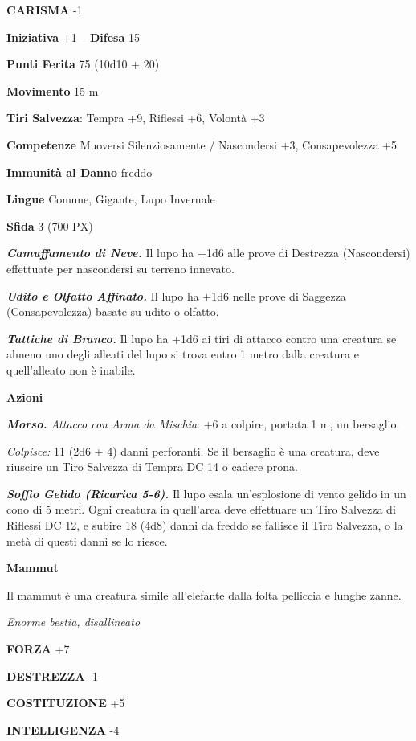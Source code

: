 \begin{multicols}{2}
\textbf{CARISMA} -1

\textbf{Iniziativa} +1 -- \textbf{Difesa} 15

\textbf{Punti Ferita} 75 (10d10 + 20)

\textbf{Movimento} 15 m

\textbf{Tiri Salvezza}: Tempra +9, Riflessi +6, Volontà +3

\textbf{Competenze} Muoversi Silenziosamente / Nascondersi +3, Consapevolezza +5

\textbf{Immunità al Danno} freddo

\textbf{Lingue} Comune, Gigante, Lupo Invernale

\textbf{Sfida} 3 (700 PX)

\textit{\textbf{Camuffamento di Neve.}} Il lupo ha +1d6 alle prove di Destrezza (Nascondersi) effettuate per nascondersi su terreno innevato.

\textit{\textbf{Udito e Olfatto Affinato.}} Il lupo ha +1d6 nelle prove di Saggezza (Consapevolezza) basate su udito o olfatto.

\textit{\textbf{Tattiche di Branco.}} Il lupo ha +1d6 ai tiri di attacco contro una creatura se almeno uno degli alleati del lupo si trova entro 1 metro dalla creatura e quell'alleato non è inabile.

\textbf{Azioni}

\textit{\textbf{Morso.} Attacco con Arma da Mischia}: +6 a colpire, portata 1 m, un bersaglio.

\textit{Colpisce:} 11 (2d6 + 4) danni perforanti. Se il bersaglio è una creatura, deve riuscire un Tiro Salvezza di Tempra DC 14 o cadere prona.

\textit{\textbf{Soffio Gelido (Ricarica 5-6).}} Il lupo esala un'esplosione di vento gelido in un cono di 5 metri. Ogni creatura in quell'area deve effettuare un Tiro Salvezza di Riflessi DC 12, e subire 18 (4d8) danni da freddo se fallisce il Tiro Salvezza, o la metà di questi danni se lo riesce.

\medskip\textbf{Mammut}

Il mammut è una creatura simile all'elefante dalla folta pelliccia e lunghe zanne.

\textit{Enorme bestia, disallineato}

\textbf{FORZA} +7

\textbf{DESTREZZA} -1

\textbf{COSTITUZIONE} +5

\textbf{INTELLIGENZA} -4


\end{multicols}
